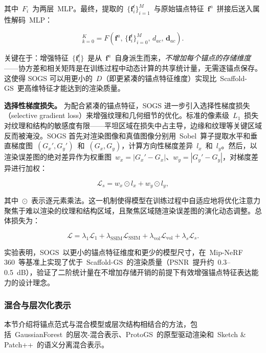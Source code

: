 其中~$F_i$~为两层~MLP。最终，提取的~$\{\mathbf{f}_i^t\}_{i=1}^{M}$~与原始锚点特征~$\mathbf{f}^a$~拼接后送入属性解码~MLP：

\begin{equation}
[\alpha_k, \, \mathbf{c}_k, \, \mathbf{q}_k, \, \mathbf{s}_k]_{k=0}^{K} = F(\mathbf{f}^a, \, \{\mathbf{f}_i^t\}_{i=0}^{M}, \, d_{ac}, \, \mathbf{d}_{ac}).
\end{equation}

关键在于：增强特征~$\{\mathbf{f}_i^t\}$~是从~$\mathbf{f}^a$~自身派生而来，\emph{不增加每个锚点的存储维度}——协方差和相关矩阵是在训练过程中动态计算的共享统计量，无需逐锚点保存。这使得 SOGS 可以用更小的~$D$（即更紧凑的锚点特征维度）实现比~Scaffold-GS~更高维特征才能达到的渲染质量。

\textbf{选择性梯度损失。}
为配合紧凑的锚点特征，SOGS 进一步引入选择性梯度损失（selective gradient loss）来增强纹理和几何细节的优化。标准的像素级~$L_1$~损失对纹理和结构的敏感度有限——平坦区域在损失中占主导，边缘和纹理等关键区域反而被淹没。SOGS 首先对渲染图像和真值图像分别用~Sobel~算子提取水平和垂直梯度图~$(G_x', G_y')$~和~$(G_x, G_y)$，计算方向性梯度差异~$l_x$~和~$l_y$。然后，以渲染误差图的绝对差异作为权重图~$w_x = |G_x' - G_x|$、$w_y = |G_y' - G_y|$，对梯度差异进行加权：

\begin{equation}
\mathcal{L}_s = w_x \odot l_x + w_y \odot l_y,
\end{equation}

其中~$\odot$~表示逐元素乘法。这一机制使得模型在训练过程中自适应地将优化注意力聚焦于难以渲染的纹理和结构区域，且聚焦区域随渲染误差图的演化动态调整。总体损失为：

\begin{equation}
\mathcal{L} = \lambda_1 \mathcal{L}_1 + \lambda_{\text{SSIM}} \mathcal{L}_{\text{SSIM}} + \lambda_{\text{vol}} \mathcal{L}_{\text{vol}} + \lambda_s \mathcal{L}_s.
\end{equation}

实验表明，SOGS~以更小的锚点特征维度和更少的模型尺寸，在~Mip-NeRF 360~等基准上实现了优于~Scaffold-GS~的渲染质量（PSNR~提升约~0.3--0.5~dB），验证了二阶统计量在不增加存储开销的前提下有效增强锚点特征表达能力的设计理念。

\subsubsection{混合与层次化表示}

本节介绍将锚点范式与混合模型或层次结构相结合的方法，包括~GaussianForest~的层次-混合表示、ProtoGS~的原型驱动渲染和~Sketch \& Patch++~的语义分离混合表示。

